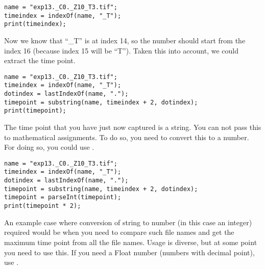 \begin{lstlisting}
name = "exp13._C0._Z10_T3.tif";
timeindex = indexOf(name, "_T");
print(timeindex);
\end{lstlisting}

Now we know that ``\_T'' is at index 14, so the number should start from the index 16 (because index 15 will be ``T''). Taken this into account, we could extract the time point. 

\begin{lstlisting}
name = "exp13._C0._Z10_T3.tif";
timeindex = indexOf(name, "_T");
dotindex = lastIndexOf(name, ".");
timepoint = substring(name, timeindex + 2, dotindex);
print(timepoint);
\end{lstlisting}

The time point that you have just now captured is a string. You can not pass this to mathematical assignments. To do so, you need to convert this to a number. For doing so, you could use . 

\begin{lstlisting}
name = "exp13._C0._Z10_T3.tif";
timeindex = indexOf(name, "_T");
dotindex = lastIndexOf(name, ".");
timepoint = substring(name, timeindex + 2, dotindex);
timepoint = parseInt(timepoint);
print(timepoint * 2);
\end{lstlisting}

An example case where conversion of string to number (in this case an integer) required would be when you need to compare such file names and get the maximum time point from all the file names. Usage is diverse, but at some point you need to use this. If you need a Float number (numbers with decimal point), use .
